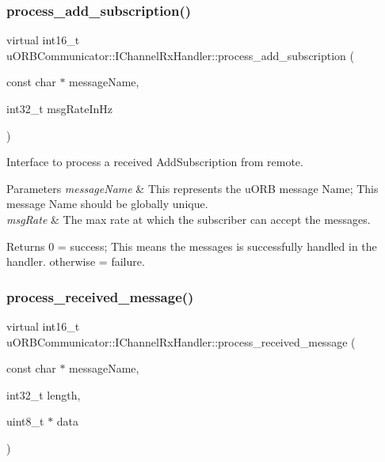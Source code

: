 \subsubsection{\texorpdfstring{process\+\_\+add\+\_\+subscription()}{process\_add\_subscription()}}
{\footnotesize\ttfamily virtual int16\+\_\+t u\+O\+R\+B\+Communicator\+::\+I\+Channel\+Rx\+Handler\+::process\+\_\+add\+\_\+subscription (\begin{DoxyParamCaption}\item[{const char $\ast$}]{message\+Name,  }\item[{int32\+\_\+t}]{msg\+Rate\+In\+Hz }\end{DoxyParamCaption})\hspace{0.3cm}{\ttfamily [pure virtual]}}

Interface to process a received Add\+Subscription from remote. 
\begin{DoxyParams}{Parameters}
{\em message\+Name} & This represents the u\+O\+RB message Name; This message Name should be globally unique. \\
\hline
{\em msg\+Rate} & The max rate at which the subscriber can accept the messages. \\
\hline
\end{DoxyParams}
\begin{DoxyReturn}{Returns}
0 = success; This means the messages is successfully handled in the handler. otherwise = failure. 
\end{DoxyReturn}
\mbox{\label{classuORBCommunicator_1_1IChannelRxHandler_a9fbd88a46229eaf6acb13d3724a2c6f7}} 
\subsubsection{\texorpdfstring{process\+\_\+received\+\_\+message()}{process\_received\_message()}}
{\footnotesize\ttfamily virtual int16\+\_\+t u\+O\+R\+B\+Communicator\+::\+I\+Channel\+Rx\+Handler\+::process\+\_\+received\+\_\+message (\begin{DoxyParamCaption}\item[{const char $\ast$}]{message\+Name,  }\item[{int32\+\_\+t}]{length,  }\item[{uint8\+\_\+t $\ast$}]{data }\end{DoxyParamCaption})\hspace{0.3cm}{\ttfamily [pure virtual]}}

